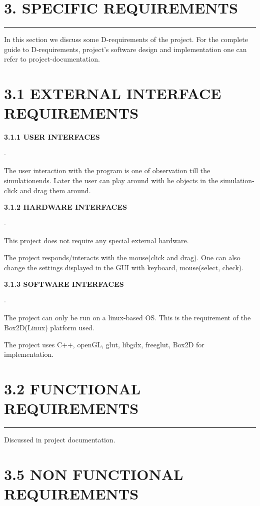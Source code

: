 \documentclass{report}
\begin{document}
\section*{\huge 3. SPECIFIC REQUIREMENTS}
\hrule \large
In this section we discuss some D-requirements of the project. For the complete guide to D-requirements, project's software design and implementation one can refer to project-documentation.

\section*{3.1 EXTERNAL INTERFACE REQUIREMENTS}
\large \textbf{3.1.1 USER INTERFACES}
\begin{list}{$\cdot$}{\setlength{\leftmargin}{0em}}
\item The user interaction with the program is one of observation till the simulationends. Later the user can play around with he objects in the simulation- click and drag them around.
\end{list}

\large \textbf{3.1.2 HARDWARE INTERFACES}
\begin{list}{$\cdot$}{\setlength{\leftmargin}{0em}}
\item This project does not require any special external hardware.
\item The project responds/interacts with the mouse(click and drag).
One can also change the settings displayed in the GUI with keyboard, mouse(select, check).
\end{list}

\large \textbf{3.1.3 SOFTWARE INTERFACES}
\begin{list}{$\cdot$}{\setlength{\leftmargin}{0em}}
\item The project can only be run on a linux-based OS. This is the requirement of the Box2D(Linux) platform used.
\item The project uses C++, openGL, glut, libgdx, freeglut, Box2D for implementation.
\end{list}

\section*{3.2 FUNCTIONAL REQUIREMENTS}
\hrule \large Discussed in project documentation.

\section*{3.5 NON FUNCTIONAL REQUIREMENTS}
\end{document}
